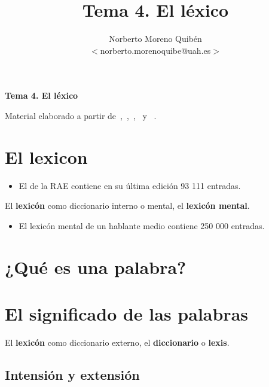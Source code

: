 \documentclass[11pt]{article}
\title{Tema 4. El léxico}
\author{Norberto Moreno Quibén\\
        \small $<$norberto.morenoquibe@uah.es$>$}
\date{}
\begin{document}
\textbf{\Large Tema 4. El léxico}

\tableofcontents

Material elaborado a partir de~\textcite{bosque1982sobre-la-teoria,bosque2004combinatoria-y-signi},~\textcite{murphy2010lexicalmeaning},~\textcite{jezek2015the-lexicon-an},~\textcite{pustejovsky2019the-lexicon} y ~\textcite[caps. «Lexicología» y «Diccionarios»][]{2016enciclopedia-de-linguistica}.

%
%
\printbibliography

\section{El lexicon}
\begin{itemize}
  \item El \href{https://dle.rae.es/?w=diccionario}{} de la RAE contiene en su última edición 93 111 entradas.
\end{itemize}


El \textbf{lexicón} como diccionario interno o mental, el \textbf{lexicón mental}.
\begin{itemize}
  \item El lexicón mental de un hablante medio contiene 250 000 entradas.
\end{itemize}



\section{¿Qué es una palabra?}
\section{El significado de las palabras}

El \textbf{lexicón} como diccionario externo, el \textbf{diccionario} o \textbf{lexis}.

\subsection{Intensión y extensión}
\end{document}
